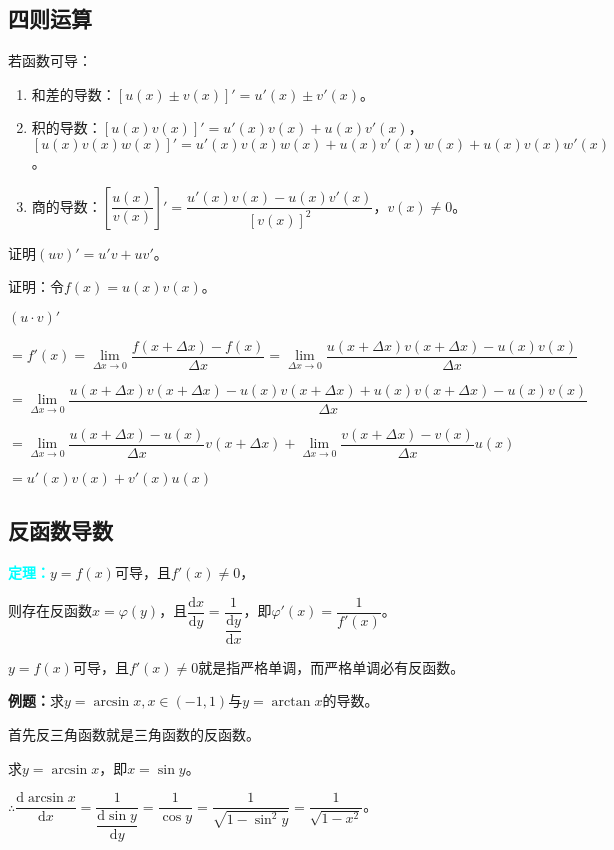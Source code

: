 \documentclass[UTF8, 12pt]{ctexart}
\begin{document}
\subsection{四则运算}

若函数可导：

\begin{enumerate}
    \item 和差的导数：$[u(x)\pm v(x)]'=u'(x)\pm v'(x)$。
    \item 积的导数：$[u(x)v(x)]'=u'(x)v(x)+u(x)v'(x)$，\\ $[u(x)v(x)w(x)]'=u'(x)v(x)w(x)+u(x)v'(x)w(x)+u(x)v(x)w'(x)$。
    \item 商的导数：$\left[\dfrac{u(x)}{v(x)}\right]'=\dfrac{u'(x)v(x)-u(x)v'(x)}{[v(x)]^2}$，$v(x)\neq 0$。
\end{enumerate}

证明$(uv)'=u'v+uv'$。

证明：令$f(x)=u(x)v(x)$。

$(u\cdot v)'$

$=f'(x)=\lim\limits_{\Delta x\to 0}\dfrac{f(x+\Delta x)-f(x)}{\Delta x}=\lim\limits_{\Delta x\to 0}\dfrac{u(x+\Delta x)v(x+\Delta x)-u(x)v(x)}{\Delta x}$

$=\lim\limits_{\Delta x\to 0}\dfrac{u(x+\Delta x)v(x+\Delta x)-u(x)v(x+\Delta x)+u(x)v(x+\Delta x)-u(x)v(x)}{\Delta x}$

$=\lim\limits_{\Delta x\to 0}\dfrac{u(x+\Delta x)-u(x)}{\Delta x}v(x+\Delta x) +\lim\limits_{\Delta x\to 0}\dfrac{v(x+\Delta x)-v(x)}{\Delta x}u(x)$

$=u'(x)v(x)+v'(x)u(x)$

\subsection{反函数导数}

\textcolor{aqua}{\textbf{定理：}}$y=f(x)$可导，且$f'(x)\neq 0$，

则存在反函数$x=\varphi(y)$，且$\dfrac{\textrm{d}x}{\textrm{d}y}=\dfrac{1}{\dfrac{\textrm{d}y}{\textrm{d}x}}$，即$\varphi'(x)=\dfrac{1}{f'(x)}$。\medskip

$y=f(x)$可导，且$f'(x)\neq 0$就是指严格单调，而严格单调必有反函数。

\textbf{例题：}求$y=\arcsin x,x\in(-1,1)$与$y=\arctan x$的导数。

首先反三角函数就是三角函数的反函数。

求$y=\arcsin x$，即$x=\sin y$。\medskip

$\therefore\dfrac{\textrm{d}\arcsin x}{\textrm{d}x}=\dfrac{1}{\dfrac{\textrm{d}\sin y}{\textrm{d}y}}=\dfrac{1}{\cos y}=\dfrac{1}{\sqrt{1-\sin^2y}}=\dfrac{1}{\sqrt{1-x^2}}$。\medskip
\end{document}
